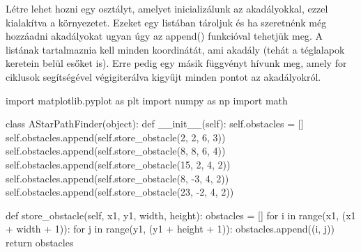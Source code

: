 Létre lehet hozni egy osztályt, amelyet inicializálunk az akadályokkal, ezzel kialakítva a környezetet. Ezeket egy listában tároljuk és ha szeretnénk még hozzáadni akadályokat ugyan úgy az append() funkcióval tehetjük meg. A listának tartalmaznia kell minden koordinátát, ami akadály (tehát a téglalapok keretein belül esőket is). Erre pedig egy másik függvényt hívunk meg, amely for ciklusok segítségével végigiterálva kigyűjt minden pontot az akadályokról. 
\begin{python}
import matplotlib.pyplot as plt
import numpy as np
import math


class AStarPathFinder(object):
    def __init__(self):
        self.obstacles = []
        self.obstacles.append(self.store_obstacle(2, 2, 6, 3))
        self.obstacles.append(self.store_obstacle(8, 8, 6, 4))
        self.obstacles.append(self.store_obstacle(15, 2, 4, 2))
        self.obstacles.append(self.store_obstacle(8, -3, 4, 2))
        self.obstacles.append(self.store_obstacle(23, -2, 4, 2))
        
 	def store_obstacle(self, x1, y1, width, height):
        obstacles = []
        for i in range(x1, (x1 + width + 1)):
            for j in range(y1, (y1 + height + 1)):
                obstacles.append((i, j))
        return obstacles
\end{python}


